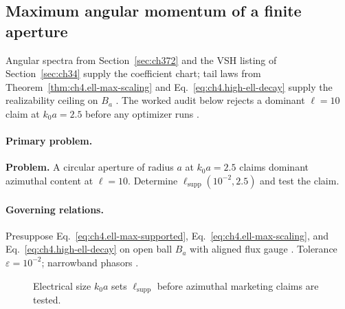 ﻿\subsection{Maximum angular momentum of a finite aperture}
\label{sec:ch4101}

Angular spectra from Section~\ref{sec:ch372} and the VSH listing of Section~\ref{sec:ch34} supply the coefficient chart; tail laws from
Theorem~\ref{thm:ch4.ell-max-scaling} and Eq.~\eqref{eq:ch4.high-ell-decay} supply the realizability ceiling on \(B_{a}\) \cite{hansen1988,jackson1999,stratton1941,harrington2001}.
The worked audit below rejects a dominant \(\ell=10\) claim at \(k_{0}a=2.5\) before any optimizer runs \cite{devaney2004}.

\paragraph{Primary problem.}
\textbf{Problem.} A circular aperture of radius \(a\) at \(k_{0}a=2.5\) claims dominant azimuthal content at \(\ell=10\). Determine
\(\ell_{\mathrm{supp}}(10^{-2},2.5)\) and test the claim.

\paragraph{Governing relations.}
Presuppose Eq.~\eqref{eq:ch4.ell-max-supported}, Eq.~\eqref{eq:ch4.ell-max-scaling}, and Eq.~\eqref{eq:ch4.high-ell-decay} on open ball \(B_{a}\)
with aligned flux gauge \cite{hansen1988,stratton1941,harrington2001,jackson1999,devaney2004}. Tolerance \(\varepsilon=10^{-2}\); narrowband phasors
\cite{stratton1941}.

\begin{figure}[t]
\centering
{}
\caption{Electrical size \(k_{0}a\) sets \(\ell_{\mathrm{supp}}\) before azimuthal marketing claims are tested.}
\label{fig:ch4.ex-ell-max-aperture}
\end{figure}

